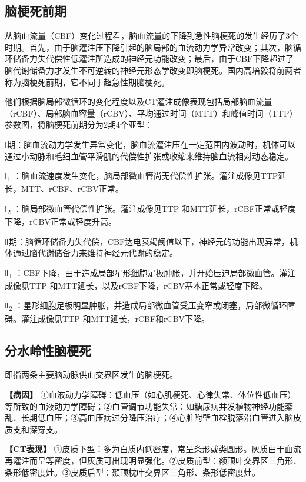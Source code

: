 \subsection{脑梗死前期}

从脑血流量（CBF）变化过程看，脑血流量的下降到急性脑梗死的发生经历了3个时期。首先，由于脑灌注压下降引起的脑局部的血流动力学异常改变；其次，脑循环储备力失代偿性低灌注所造成的神经元功能改变；最后，由于CBF下降超过了脑代谢储备力才发生不可逆转的神经元形态学改变即脑梗死。国内高培毅将前两者称为脑梗死前期，它不同于超急性期脑梗死。

他们根据脑局部微循环的变化程度以及CT灌注成像表现包括局部脑血流量（rCBF）、局部脑血容量（rCBV）、平均通过时间（MTT）和峰值时间（TTP）参数图，将脑梗死前期分为2期4个亚型：

Ⅰ期：脑血流动力学发生异常变化，脑血流灌注压在一定范围内波动时，机体可以通过小动脉和毛细血管平滑肌的代偿性扩张或收缩来维持脑血流相对动态稳定。

Ⅰ\textsubscript{1}
：脑血流速度发生变化，脑局部微血管尚无代偿性扩张。灌注成像见TTP延长，MTT、rCBF、rCBV正常。

Ⅰ\textsubscript{2} ：脑局部微血管代偿性扩张。灌注成像见TTP
和MTT延长，rCBF正常或轻度下降，rCBV正常或轻度升高。

Ⅱ期：脑循环储备力失代偿，CBF达电衰竭阈值以下，神经元的功能出现异常，机体通过脑代谢储备力来维持神经元代谢的稳定。

Ⅱ\textsubscript{1}
：CBF下降，由于造成局部星形细胞足板肿胀，并开始压迫局部微血管。灌注成像见TTP
和MTT延长，以及rCBF下降，rCBV基本正常或轻度下降。

Ⅱ\textsubscript{2}
：星形细胞足板明显肿胀，并造成局部微血管受压变窄或闭塞，局部微循环障碍。灌注成像见TTP
和MTT延长，rCBF和rCBV下降。

\subsection{分水岭性脑梗死}

即指两条主要脑动脉供血交界区发生的脑梗死。

\textbf{【病因】}
①血液动力学障碍：低血压（如心肌梗死、心律失常、体位性低血压）等所致的血液动力学障碍；②血管调节功能失常：如糖尿病并发植物神经功能紊乱、长期低血压；③高血压病过分降压治疗；④心脏附壁血栓脱落沿血管进入脑皮质支和深穿支。

\textbf{【CT表现】}
①皮质下型：多为白质内低密度，常呈条形或类圆形。灰质由于血流再灌注而呈等密度，但灰质可出现明显强化。②皮质前型：额顶叶交界区三角形、条形低密度灶。③皮质后型：颞顶枕叶交界区三角形、条形低密度灶。

